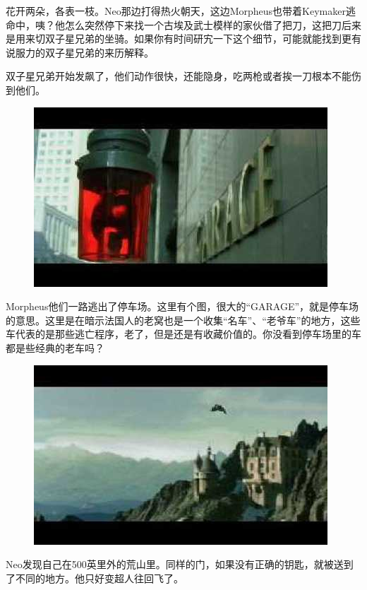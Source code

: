 \documentclass{ctexart}
\begin{document}
花开两朵，各表一枝。Neo那边打得热火朝天，这边Morpheus也带着Keymaker逃命中，咦？他怎么突然停下来找一个古埃及武士模样的家伙借了把刀，这把刀后来是用来切双子星兄弟的坐骑。如果你有时间研宄一下这个细节，可能就能找到更有说服力的双子星兄弟的来历解释。

双子星兄弟开始发飙了，他们动作很快，还能隐身，吃两枪或者挨一刀根本不能伤到他们。

\begin{figure}[htb]
\centering
\includegraphics[width=0.5\linewidth]{fig/read_reloaded-128}
\end{figure}

Morpheus他们一路逃出了停车场。这里有个图，很大的“GARAGE”，就是停车场的意思。这里是在暗示法国人的老窝也是一个收集“名车”、“老爷车”的地方，这些车代表的是那些逃亡程序，老了，但是还是有收藏价值的。你没看到停车场里的车都是些经典的老车吗？

\begin{figure}[htb]
\centering
\includegraphics[width=0.5\linewidth]{fig/read_reloaded-129}
\end{figure}

Neo发现自己在500英里外的荒山里。同样的门，如果没有正确的钥匙，就被送到了不同的地方。他只好变超人往回飞了。
\end{document}
